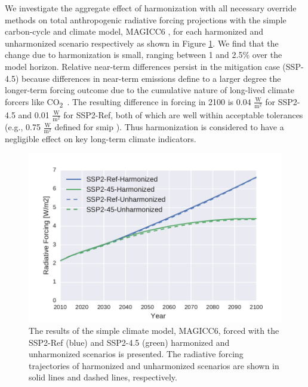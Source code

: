 \documentclass[review]{elsarticle}
\newcommand{\cotwo}{CO\textsubscript{2}~}
\begin{document}
We investigate the aggregate effect of harmonization with all necessary override
methods on total anthropogenic radiative forcing projections with the simple
carbon-cycle and climate model, MAGICC6 \cite{meinshausen2011emulating,
  meinshausen2011rcp}, for each harmonized and unharmonized scenario
respectively as shown in Figure \ref{fig:forcing}. We find that the change due
to harmonization is small, ranging between 1 and 2.5\% over the model
horizon. Relative near-term differences persist in the mitigation case (SSP-4.5)
because differences in near-term emissions define to a larger degree the
longer-term forcing outcome due to the cumulative nature of long-lived climate
forcers like \cotwo.  The resulting difference in forcing in 2100 is 0.04
$\frac{\text{W}}{\text{m}^2}$ for SSP2-4.5 and 0.01
$\frac{\text{W}}{\text{m}^2}$ for SSP2-Ref, both of which are well within
acceptable tolerances (e.g., 0.75 $\frac{\text{W}}{\text{m}^2}$ defined for
\gls{smip} \cite{oneill_scenario_2016}). Thus harmonization is considered to
have a negligible effect on key long-term climate indicators.

\begin{figure}
  \begin{center}
    \includegraphics[width=\textwidth]{results_forcing.pdf}
    \caption[]{
      \label{fig:forcing}
      The results of the simple climate model, MAGICC6, forced with the SSP2-Ref
      (blue) and SSP2-4.5 (green) harmonized and unharmonized scenarios is
      presented. The radiative forcing trajectories of harmonized and
      unharmonized scenarios are shown in solid lines and dashed lines,
      respectively.  }
  \end{center}
\end{figure}
\end{document}
